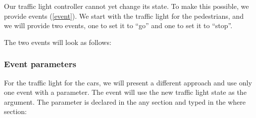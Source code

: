 Our traffic light controller cannot yet change its state.  To make this possible, we provide events (\ref{event}). We start with the traffic light for the pedestrians, and we will provide two events, one to set it to ``go'' and one to set it to ``stop''.


The two events will look as follows:


\subsubsection{Event parameters}

For the traffic light for the cars, we will present a different approach and use only one event with a parameter.  The event will use the new traffic light state as the argument.  The parameter is declared in the \textsf{any} section and typed in the \textsf{where} section:


